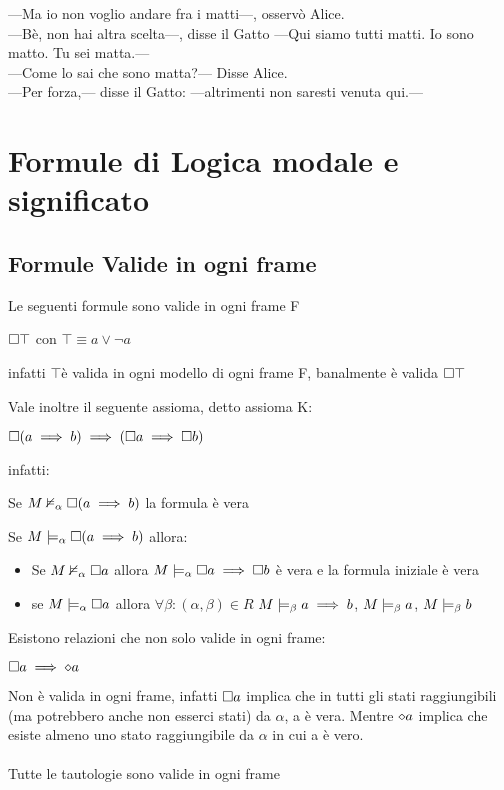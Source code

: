 \begin{savequote}[80mm]
---Ma io non voglio andare fra i matti---, osservò Alice. \\
---Bè, non hai altra scelta---, disse il Gatto ---Qui siamo tutti matti. Io sono matto. Tu sei matta.--- \\
---Come lo sai che sono matta?--- Disse Alice. \\
---Per forza,--- disse il Gatto: ---altrimenti non saresti venuta qui.---
 \end{savequote} 


\chapter{Formule di Logica modale e significato}


\section{Formule Valide in ogni frame}

Le seguenti formule sono valide in ogni frame F

$\square\top$ con $\top\equiv a\vee\neg a$ 

infatti $\top$è valida in ogni modello di ogni frame F, banalmente
è valida $\square\top$

Vale inoltre il seguente assioma, detto assioma K:

$\square(a\implies b)\implies(\square a\implies\square b)$

infatti:

Se $M\nvDash_{\alpha}\square(a\implies b)$ la formula è vera

Se $M\models_{\alpha}\square(a\implies b)$ allora:
\begin{itemize}
\item Se $M\nvDash_{\alpha}\square a$ allora $M\models_{\alpha}\square a\implies\square b$
è vera e la formula iniziale è vera
\item se $M\models_{\alpha}\square a$ allora $\forall\beta:(\alpha,\beta)\in R$
$M\models_{\beta}a\implies b$, $M\models_{\beta}a$, $M\models_{\beta}b$
\end{itemize}
Esistono relazioni che non solo valide in ogni frame:

$\square a\implies\diamond a$

Non è valida in ogni frame, infatti $\square a$ implica che in tutti gli
stati raggiungibili (ma potrebbero anche non esserci stati) da $\alpha$,
a è vera. Mentre $\diamond a$ implica che esiste almeno uno stato raggiungibile
da $\alpha$ in cui a è vero.\\
\\
Tutte le tautologie sono valide in ogni frame


